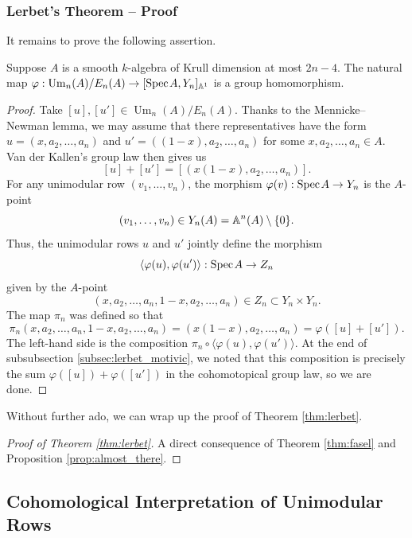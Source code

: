 \subsubsection{Lerbet's Theorem -- Proof}

It remains to prove the following assertion.

\begin{proposition}\label{prop:almost_there}
    Suppose $A$ is a smooth $k$-algebra of Krull dimension at most $2n-4$. The natural map $\varphi: \operatorname{Um}_n(A)/E_n(A) \to [\text{Spec}\hspace{0.1em} A, Y_n]_{\mathbb{A}^1}$ is a group homomorphism.
\end{proposition}
\begin{proof}
    Take $[u],[u'] \in \operatorname{Um}_n(A)/E_n(A)$. Thanks to the Mennicke--Newman lemma, we may assume that there representatives have the form $u = (x,a_2,\ldots,a_n)$ and $u' = ((1-x),a_2,\ldots,a_n)$ for some $x,a_2,\ldots,a_n \in A$. Van der Kallen's group law then gives us
    \[
    [u] + [u'] = [(x(1-x),a_2,\ldots,a_n)].
    \]
    For any unimodular row $(v_1,\ldots,v_n)$, the morphism $\varphi(v): \text{Spec}\hspace{0.1em} A \to Y_n$ is the $A$-point \[(v_1,\ldots,v_n) \in Y_n(A) = \mathbb{A}^n(A)\setminus\{0\}.\] 
    Thus, the unimodular rows $u$ and $u'$ jointly define the morphism 
    \[
    \langle\varphi(u),\varphi(u')\rangle: \text{Spec}\hspace{0.1em} A \to Z_n
    \]
    given by the $A$-point
    \[(x,a_2,\ldots,a_n,1-x,a_2,\ldots,a_n) \in Z_n \subset Y_n \times Y_n.\]
    The map $\pi_n$ was defined so that
    \[\pi_n(x,a_2,\ldots,a_n,1-x,a_2,\ldots,a_n) = (x(1-x),a_2,\ldots,a_n) = \varphi([u] + [u']).\]
    The left-hand side is the composition $\pi_n \circ \langle \varphi(u),\varphi(u')\rangle$. At the end of subsubsection \ref{subsec:lerbet_motivic}, we noted that this composition is precisely the sum $\varphi([u]) + \varphi([u'])$ in the cohomotopical group law, so we are done.
\end{proof}

Without further ado, we can wrap up the proof of Theorem \ref{thm:lerbet}.

\begin{proof}[Proof of Theorem \ref{thm:lerbet}]
    A direct consequence of Theorem \ref{thm:fasel} and Proposition \ref{prop:almost_there}.
\end{proof}

\subsection{Cohomological Interpretation of Unimodular Rows}\label{sec:cohomology}

